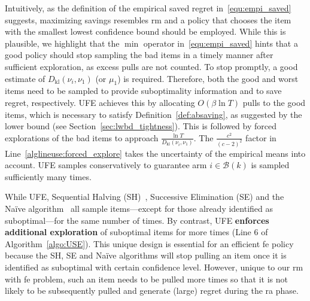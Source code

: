 \documentclass[twoside,11pt]{article}
\newcommand{\kl}{D_{\mathrm{kl}}}
\newcommand{\calB}{\mathcal{B}}
\newcommand{\ouralgfe}{\textsc{UFE}}
\newcounter{algline}[algorithm]
\begin{document}
Intuitively, as the definition of the empirical saved regret in~\eqref{equ:empi_saved} suggests, maximizing savings resembles \ac{rm} and a policy that chooses the item with the smallest lowest confidence bound  should be employed. While this is plausible, we highlight that the $\min$ operator in~\eqref{equ:empi_saved} hints that a good policy should stop sampling the bad items in a timely manner after sufficient exploration, as  excess pulls are not counted. To stop promptly, a good estimate of $\kl(\nu_i,\nu_1)$ (or $\mu_1$) is required. Therefore, both the good and worst items need to be sampled to provide suboptimality information and to save regret, respectively. 
  \ouralgfe{} achieves this by allocating $O(\beta \ln T)$ pulls to the good items, which is   necessary to satisfy Definition~\ref{def:absaving}, as suggested by the lower bound (see Section~\ref{sec:lwbd_tightness}). This is   followed by forced explorations of the bad items to approach $\frac{\ln T}{\kl(\nu_i,\nu_1)}$. 
The $\frac{c^2}{(c-2)^2}$ factor in Line~\ref{alglineuse:forced_explore} takes the uncertainty of the empirical means into account. \ouralgfe{}  samples conservatively to guarantee arm $i\in\calB(k)$ is sampled sufficiently many times.


\begin{remark}
    While \ouralgfe{}, Sequential Halving (SH)~\citep{karnin2013optimal}, Successive Elimination (SE) and the Na\"ive algorithm~\citep{Eyal2006action} all sample items---except for those already identified as suboptimal---for the same number of times. By contrast,  \ouralgfe{} \textbf{enforces additional exploration} of suboptimal items for more times (Line 6 of Algorithm~\ref{algo:USE}). This unique design is essential for an efficient \ac{fe} policy because the SH, SE and  Na\"ive algorithms will stop pulling an item once it is identified as suboptimal with certain confidence level. However, unique to our \ac{rm} with \ac{fe} problem, such an item needs to be pulled more times so that it is not likely to be subsequently pulled and generate (large) regret during the \ac{ra} phase.
\end{remark}
\end{document}
